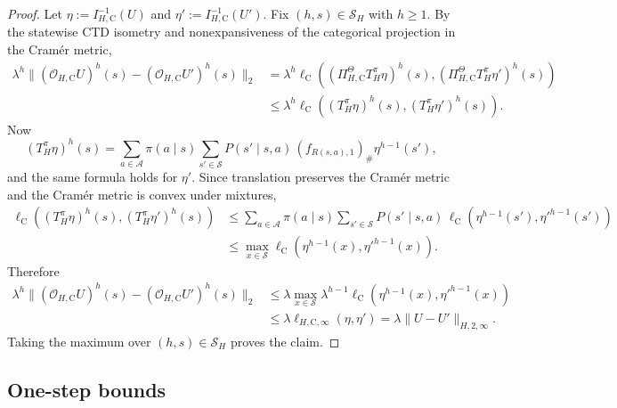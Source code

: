 \documentclass{article}
\newcommand{\X}{\mathcal{S}}
\newcommand{\A}{\mathcal{A}}
\begin{document}
\begin{proof}
Let $\eta:=I_{H,\mathrm C}^{-1}(U)$ and $\eta':=I_{H,\mathrm C}^{-1}(U')$. Fix $(h,s)\in\mathcal S_H$ with $h \ge 1$. By the statewise CTD isometry and nonexpansiveness of the categorical projection in the Cram\'er metric,
\begin{equation}
\begin{aligned}
\lambda^h \lVert (\mathcal O_{H,\mathrm C}U)^h(s)-(\mathcal O_{H,\mathrm C}U')^h(s) \rVert_2 &= \lambda^h \ell_{\mathrm C}\left( (\Pi_{H,\mathrm C}^{\Theta}T_H^\pi\eta)^h(s), (\Pi_{H,\mathrm C}^{\Theta}T_H^\pi\eta')^h(s) \right) \\ 
&\le \lambda^h \ell_{\mathrm C}\left( (T_H^\pi\eta)^h(s), (T_H^\pi\eta')^h(s) \right).
\end{aligned}
\end{equation}
Now
\begin{equation}
(T_H^\pi\eta)^h(s) = \sum_{a\in\A}\pi(a \mid s)\sum_{s'\in\X}P(s' \mid s,a)\, (f_{R(s,a),1})_\#\eta^{h-1}(s'),
\end{equation}
and the same formula holds for $\eta'$. Since translation preserves the Cram\'er metric and the Cram\'er metric is convex under mixtures,
\begin{equation}
\begin{aligned}
\ell_{\mathrm C}\left( (T_H^\pi\eta)^h(s), (T_H^\pi\eta')^h(s) \right) &\le \sum_{a\in\A}\pi(a \mid s)\sum_{s'\in\X}P(s' \mid s,a)\, \ell_{\mathrm C}\left(\eta^{h-1}(s'),{\eta'}^{h-1}(s')\right) \\ 
&\le \max_{x\in\X} \ell_{\mathrm C}\left(\eta^{h-1}(x),{\eta'}^{h-1}(x)\right).
\end{aligned}
\end{equation}
Therefore
\begin{equation}
\begin{aligned}
\lambda^h \lVert (\mathcal O_{H,\mathrm C}U)^h(s)-(\mathcal O_{H,\mathrm C}U')^h(s) \rVert_2 &\le \lambda \max_{x\in\X} \lambda^{h-1} \ell_{\mathrm C}\left(\eta^{h-1}(x),{\eta'}^{h-1}(x)\right) \\ 
&\le \lambda \ell_{H,\mathrm C,\infty}(\eta,\eta') = \lambda \lVert U-U'\rVert_{H,2,\infty}.
\end{aligned}
\end{equation}
Taking the maximum over $(h,s)\in\mathcal S_H$ proves the claim.
\end{proof}

\subsection{One-step bounds}
\end{document}
